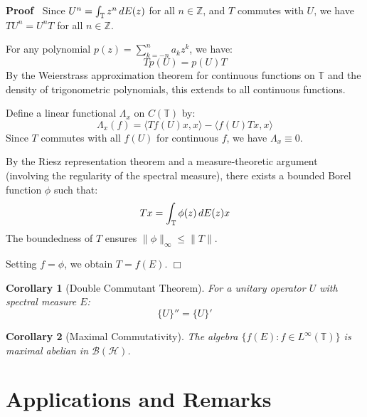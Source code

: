 \documentclass{article}
\newenvironment{proof}{\noindent\textbf{Proof\ }}{\hspace*{\fill}$\Box$\medskip}
\newtheorem{corollary}{Corollary}
\begin{document}
\begin{proof}
  Since $U^n = \int_{\mathbb{T}} z^n  \hspace{0.17em} dE (z)$ for all $n \in
  \mathbb{Z}$, and $T$ commutes with $U$, we have $TU^n = U^n T$ for all $n
  \in \mathbb{Z}$.
  
  For any polynomial $p (z) = \sum_{k = - n}^n a_k z^k$, we have:
  \begin{equation}
    Tp (U) = p (U) T
  \end{equation}
  By the Weierstrass approximation theorem for continuous functions on
  $\mathbb{T}$ and the density of trigonometric polynomials, this extends to
  all continuous functions.
  
  Define a linear functional $\Lambda_x$ on $C (\mathbb{T})$ by:
  \begin{equation}
    \Lambda_x (f) = \langle Tf (U) x, x \rangle - \langle f (U) Tx, x \rangle
  \end{equation}
  Since $T$ commutes with all $f (U)$ for continuous $f$, we have $\Lambda_x
  \equiv 0$.
  
  By the Riesz representation theorem and a measure-theoretic argument
  (involving the regularity of the spectral measure), there exists a bounded
  Borel function $\phi$ such that:
  \begin{equation}
    Tx = \int_{\mathbb{T}} \phi (z)  \hspace{0.17em} dE (z) x
  \end{equation}
  The boundedness of $T$ ensures $\| \phi \|_{\infty} \leq \|T\|$.
  
  Setting $f = \phi$, we obtain $T = f (E)$.
\end{proof}

\begin{corollary}
  [Double Commutant Theorem] For a unitary operator $U$ with spectral measure
  $E$:
  \begin{equation}
    \{U\}'' = \{U\}'
  \end{equation}
\end{corollary}

\begin{corollary}
  [Maximal Commutativity] The algebra $\{f (E) : f \in L^{\infty}
  (\mathbb{T})\}$ is maximal abelian in $\mathcal{B} (\mathcal{H})$.
\end{corollary}

\section{Applications and Remarks}
\end{document}
